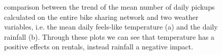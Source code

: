 \begin{figure}
	\centering
	\quad
	\quad
	\caption{comparison between the trend of the mean number of daily pickups calculated on the entire bike sharing network and two weather variables, i.e. the mean daily feels-like temperature (a) and the daily rainfall (b). Through these plots we can see that temperature has a positive effects on rentals, instead rainfall a negative impact.}
\end{figure}

